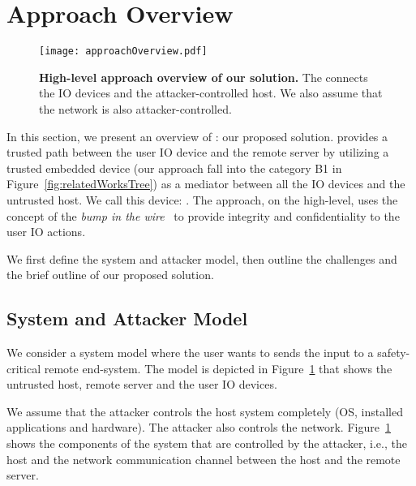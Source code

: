 \section{\name Approach Overview}
\label{sec:approach}


\begin{figure}[t]
\centering
\texttt{[image: approachOverview.pdf]}
\caption{\textbf{High-level approach overview of our solution.}  The \device connects the IO devices and the attacker-controlled host. We also assume that the network is also attacker-controlled.}
\spacesave
\label{fig:approachOverview}
\centering
\end{figure}


In this section, we present an overview of \name: our proposed solution. \name provides a trusted path between the user IO device and the remote server by utilizing a trusted embedded device (our approach fall into the category B1 in Figure~\ref{fig:relatedWorksTree}) as a mediator between all the IO devices and the untrusted host. We call this device: \device. The approach, on the high-level, uses the concept of the \emph{bump in the wire}~\cite{McCPerRei2006} to provide integrity and confidentiality to the user IO actions.  %

We first define the system and attacker model, then outline the challenges and the brief outline of our proposed solution.



\subsection{System and Attacker Model}
\label{sec:approach:systemAttackerModel}

We consider a system model where the user wants to sends the input to a safety-critical remote end-system. The model is depicted in Figure~\ref{fig:approachOverview} that shows the untrusted host, remote server and the user IO devices. 

We assume that the attacker controls the host system completely (OS, installed applications and hardware). The attacker also controls the network. %
Figure~\ref{fig:approachOverview} shows the components of the system that are controlled by the attacker, i.e., the host and the network communication channel between the host and the remote server.

